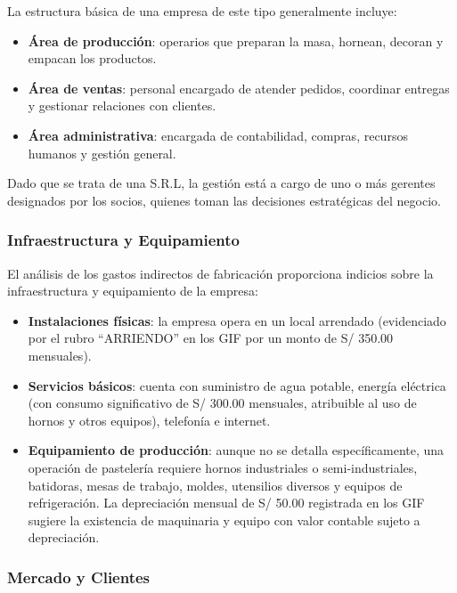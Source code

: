 \documentclass[
  stu,
  floatsintext,
  longtable,
  a4paper,
  nolmodern,
  notxfonts,
  notimes,
  12pt,
  colorlinks=true,linkcolor=blue,citecolor=blue,urlcolor=blue]{apa7}
\providecommand{\tightlist}{%
  \setlength{\itemsep}{0pt}\setlength{\parskip}{0pt}}
\begin{document}
La estructura básica de una empresa de este tipo generalmente incluye:

\begin{itemize}
\tightlist
\item
  \textbf{Área de producción}: operarios que preparan la masa, hornean,
  decoran y empacan los productos.
\item
  \textbf{Área de ventas}: personal encargado de atender pedidos,
  coordinar entregas y gestionar relaciones con clientes.
\item
  \textbf{Área administrativa}: encargada de contabilidad, compras,
  recursos humanos y gestión general.
\end{itemize}

Dado que se trata de una S.R.L, la gestión está a cargo de uno o más
gerentes designados por los socios, quienes toman las decisiones
estratégicas del negocio.

\subsubsection{Infraestructura y
Equipamiento}\label{infraestructura-y-equipamiento}

El análisis de los gastos indirectos de fabricación proporciona indicios
sobre la infraestructura y equipamiento de la empresa:

\begin{itemize}
\tightlist
\item
  \textbf{Instalaciones físicas}: la empresa opera en un local arrendado
  (evidenciado por el rubro ``ARRIENDO'' en los GIF por un monto de S/
  350.00 mensuales).
\item
  \textbf{Servicios básicos}: cuenta con suministro de agua potable,
  energía eléctrica (con consumo significativo de S/ 300.00 mensuales,
  atribuible al uso de hornos y otros equipos), telefonía e internet.
\item
  \textbf{Equipamiento de producción}: aunque no se detalla
  específicamente, una operación de pastelería requiere hornos
  industriales o semi-industriales, batidoras, mesas de trabajo, moldes,
  utensilios diversos y equipos de refrigeración. La depreciación
  mensual de S/ 50.00 registrada en los GIF sugiere la existencia de
  maquinaria y equipo con valor contable sujeto a depreciación.
\end{itemize}

\subsubsection{Mercado y Clientes}\label{mercado-y-clientes}
\end{document}
